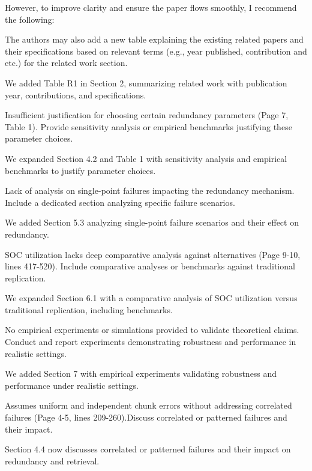 \documentclass[11pt]{article}
\newcommand{\us}{\rm \setlength{\leftskip}{0.3cm} \setlength{\rightskip}{0.3cm}}
\newcommand{\them}{\it \setlength{\leftskip}{0cm} \setlength{\rightskip}{0cm}}
\begin{document}
\them

However, to improve clarity and ensure the paper flows smoothly, I recommend the following:

The authors may also add a new table explaining the existing related papers and their specifications based on relevant terms (e.g., year published, contribution and etc.) for the related work section.

\us
We added Table R1 in Section 2, summarizing related work with publication year, contributions, and specifications.

\them

Insufficient justification for choosing certain redundancy parameters (Page 7, Table 1). Provide sensitivity analysis or empirical benchmarks justifying these parameter choices.

\us
We expanded Section 4.2 and Table 1 with sensitivity analysis and empirical benchmarks to justify parameter choices.

\them

Lack of analysis on single-point failures impacting the redundancy mechanism. Include a dedicated section analyzing specific failure scenarios.

\us
We added Section 5.3 analyzing single-point failure scenarios and their effect on redundancy.

\them

SOC utilization lacks deep comparative analysis against alternatives (Page 9-10, lines 417-520). Include comparative analyses or benchmarks against traditional replication.

\us
We expanded Section 6.1 with a comparative analysis of SOC utilization versus traditional replication, including benchmarks.

\them

No empirical experiments or simulations provided to validate theoretical claims. Conduct and report experiments demonstrating robustness and performance in realistic settings.

\us
We added Section 7 with empirical experiments validating robustness and performance under realistic settings.

\them

Assumes uniform and independent chunk errors without addressing correlated failures (Page 4-5, lines 209-260).Discuss correlated or patterned failures and their impact.

\us
Section 4.4 now discusses correlated or patterned failures and their impact on redundancy and retrieval.
\end{document}
